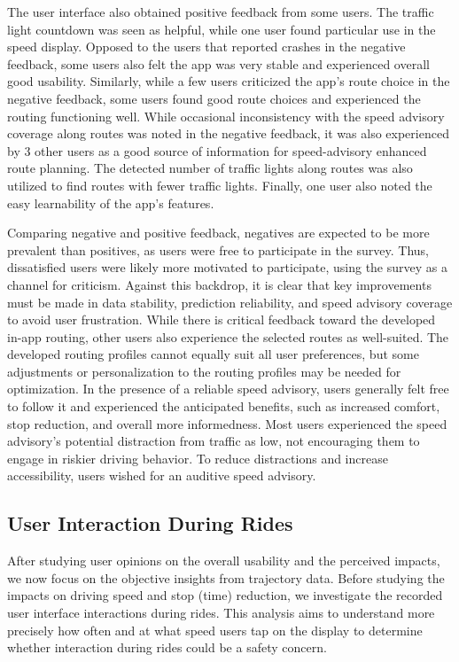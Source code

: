 The user interface also obtained positive feedback from some users. The traffic light countdown was seen as helpful, while one user found particular use in the speed display. Opposed to the users that reported crashes in the negative feedback, some users also felt the app was very stable and experienced overall good usability. Similarly, while a few users criticized the app's route choice in the negative feedback, some users found good route choices and experienced the routing functioning well. While occasional inconsistency with the speed advisory coverage along routes was noted in the negative feedback, it was also experienced by 3 other users as a good source of information for speed-advisory enhanced route planning. The detected number of traffic lights along routes was also utilized to find routes with fewer traffic lights. Finally, one user also noted the easy learnability of the app's features.

Comparing negative and positive feedback, negatives are expected to be more prevalent than positives, as users were free to participate in the survey. Thus, dissatisfied users were likely more motivated to participate, using the survey as a channel for criticism. Against this backdrop, it is clear that key improvements must be made in data stability, prediction reliability, and speed advisory coverage to avoid user frustration. While there is critical feedback toward the developed in-app routing, other users also experience the selected routes as well-suited. The developed routing profiles cannot equally suit all user preferences, but some adjustments or personalization to the routing profiles may be needed for optimization. In the presence of a reliable speed advisory, users generally felt free to follow it and experienced the anticipated benefits, such as increased comfort, stop reduction, and overall more informedness. Most users experienced the speed advisory's potential distraction from traffic as low, not encouraging them to engage in riskier driving behavior. To reduce distractions and increase accessibility, users wished for an auditive speed advisory.

\subsection{User Interaction During Rides}

After studying user opinions on the overall usability and the perceived impacts, we now focus on the objective insights from trajectory data. Before studying the impacts on driving speed and stop (time) reduction, we investigate the recorded user interface interactions during rides. This analysis aims to understand more precisely how often and at what speed users tap on the display to determine whether interaction during rides could be a safety concern.

